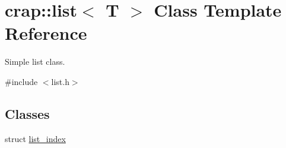 \hypertarget{classcrap_1_1list}{\section{crap\+:\+:list$<$ T $>$ Class Template Reference}
\label{classcrap_1_1list}
}


Simple list class.  




{\ttfamily \#include $<$list.\+h$>$}

\subsection*{Classes}
\begin{DoxyCompactItemize}
\item 
struct \hyperlink{structcrap_1_1list_1_1list__index}{list\+\_\+index}
\end{DoxyCompactItemize}
